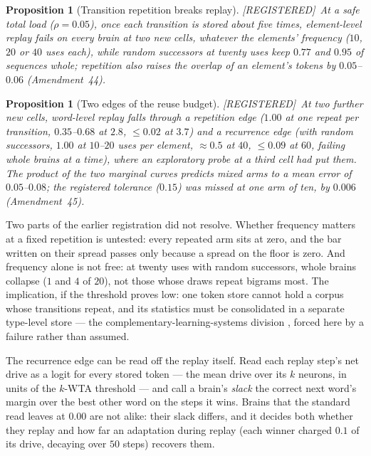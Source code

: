 \documentclass[11pt]{article}
\theoremstyle{definition}
\theoremstyle{plain}
\newtheorem{proposition}[lemma]{Proposition}
\newcommand{\REG}{\textnormal{\footnotesize\textsf{[REGISTERED]}}}
\begin{document}
\begin{proposition}[Transition repetition breaks replay]\label{prop:bigram} \REG\
At a safe total load ($\rho = 0.05$), once each transition is stored about five
times, element-level replay fails on every brain at two new cells, whatever
the elements' frequency ($10$, $20$ or $40$ uses each), while random successors at
twenty uses keep $0.77$ and $0.95$ of sequences whole; repetition also raises
the overlap of an element's tokens by $0.05$--$0.06$ (Amendment~44).
\end{proposition}

\begin{proposition}[Two edges of the reuse budget]\label{prop:edges} \REG\
At two further new cells, word-level replay falls through a repetition edge
($1.00$ at one repeat per transition, $0.35$--$0.68$ at $2.8$, $\le 0.02$ at $3.7$) and a
recurrence edge (with random successors, $1.00$ at $10$--$20$ uses per element,
$\approx 0.5$ at $40$, $\le 0.09$ at $60$, failing whole brains at a time), where an
exploratory probe at a third cell had put them. The product of the two
marginal curves predicts mixed arms to a mean error of $0.05$--$0.08$; the
registered tolerance ($0.15$) was missed at one arm of ten, by $0.006$
(Amendment~45).
\end{proposition}

Two parts of the earlier registration did not resolve. Whether frequency matters at a
fixed repetition is untested: every repeated arm sits at zero, and the bar
written on their spread passes only because a spread on the floor is zero. And
frequency alone is not free: at twenty uses with random successors, whole
brains collapse ($1$ and $4$ of $20$), not those whose draws repeat bigrams most.
The implication, if the threshold proves low: one token store cannot hold a
corpus whose transitions repeat, and its statistics must be consolidated in a
separate type-level store --- the complementary-learning-systems division
\citep{mcclelland1995why}, forced here by a failure rather than assumed.

The recurrence edge can be read off the replay itself. Read each replay step's
net drive as a logit for every stored token --- the mean drive over its $k$
neurons, in units of the $k$-WTA threshold --- and call a brain's \emph{slack}
the correct next word's margin over the best other word on the steps it wins.
Brains that the standard read leaves at $0.00$ are not alike: their slack
differs, and it decides both whether they replay and how far an adaptation
during replay (each winner charged $0.1$ of its drive, decaying over $50$ steps)
recovers them.
\end{document}

